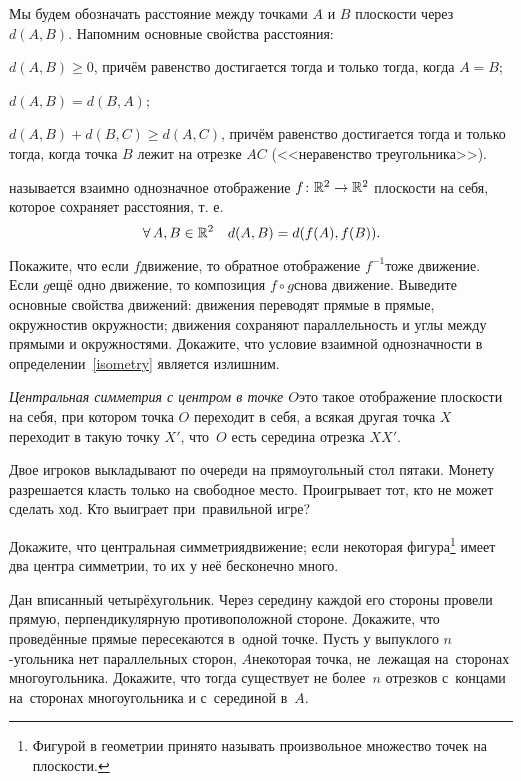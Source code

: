 \documentclass[a4paper,12pt]{article}
\begin{document}

\vskip 6mm
Мы будем обозначать расстояние между точками $A$ и $B$ плоскости
через $d(A, B)$. Напомним основные свойства расстояния:
\begin{items}{0}
\item $d(A, B) \ge 0$, причём равенство достигается тогда и только тогда, когда $A = B$;
\item $d(A, B) = d(B, A)$;
\item $d(A, B) + d(B, C) \ge d(A, C)$, причём равенство достигается тогда и только тогда, когда точка $B$ лежит на отрезке $AC$ (<<неравенство треугольника>>).
\end{items}

\label{isometry}
 называется взаимно однозначное отображение $f \colon \mathbb{R}^2 \rightarrow \mathbb{R}^2$ плоскости на себя, которое сохраняет расстояния, т. е.
\[
\,\forall\, A,B \in \mathbb{R}^2 \quad d(A, B) = d(f(A), f(B)).
\]

 Покажите, что если $f$\т движение, то обратное отображение $f^{-1}$\т тоже движение.
 Если $g$\т ещё одно движение, то композиция $f\circ g$\т снова движение.
 Выведите основные свойства движений: движения переводят прямые в прямые, окружности\т в окружности; движения сохраняют параллельность и углы между прямыми и окружностями.
 Докажите, что условие взаимной однозначности в определении~\ref{isometry} является излишним.

\emph{Центральная симметрия с центром в точке $O$}\т это такое отображение плоскости на себя, при котором точка $O$ переходит в себя, а всякая другая точка $X$ переходит в такую точку $X'$, что~$O$ есть середина отрезка $XX'$.


Двое игроков выкладывают по очереди на прямоугольный стол пятаки. Монету разрешается класть только на свободное место. Проигрывает тот, кто не может сделать ход. Кто выиграет при~правильной игре?


Докажите, что
 центральная симметрия\т движение;
 если некоторая фигура\footnote{Фигурой в геометрии принято называть произвольное множество точек на плоскости.} имеет два центра симметрии, то их у неё бесконечно много.


 Дан вписанный четырёхугольник. Через середину каждой его стороны провели прямую, перпендикулярную противоположной стороне. Докажите, что проведённые прямые пересекаются в~одной точке.
 Пусть у выпуклого $n$-угольника нет параллельных сторон, $A$\т некоторая точка, не~лежащая на~сторонах многоугольника. Докажите, что тогда существует не более~$n$ отрезков с~концами на~сторонах многоугольника и с~серединой в~$A$.
\end{document}

